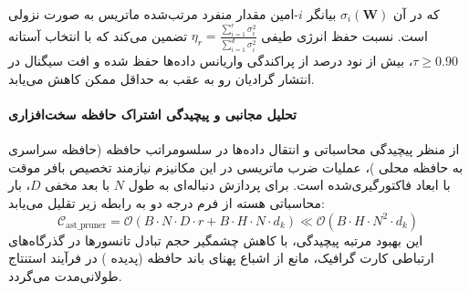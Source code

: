 که در آن $\sigma_i(\mathbf{W})$ بیانگر $i$-امین مقدار منفرد مرتب‌شده ماتریس به صورت نزولی است. نسبت حفظ انرژی طیفی $\eta_r = \frac{\sum_{i=1}^r \sigma_i^2}{\sum_{i=1}^{d} \sigma_i^2}$ تضمین می‌کند که با انتخاب آستانه $\tau \ge 0.90$، بیش از نود درصد از پراکندگی واریانس داده‌ها حفظ شده و افت سیگنال در انتشار گرادیان رو به عقب به حداقل ممکن کاهش می‌یابد.

\paragraph{تحلیل مجانبی و پیچیدگی اشتراک حافظه سخت‌افزاری}
از منظر پیچیدگی محاسباتی و انتقال داده‌ها در سلسومراتب حافظه (حافظه سراسری  به حافظه محلی )، عملیات ضرب ماتریسی در این مکانیزم نیازمند تخصیص بافر موقت با ابعاد فاکتورگیری‌شده است. برای پردازش دنباله‌ای به طول $N$ با بعد مخفی $D$، بار محاسباتی هسته از فرم درجه دو به رابطه زیر تقلیل می‌یابد:
\begin{equation}
\label{eq:complexity_ast_pruner}
\mathcal{C}_{\text{ast\_pruner}} = \mathcal{O}\left( B \cdot N \cdot D \cdot r + B \cdot H \cdot N \cdot d_k \right) \ll \mathcal{O}\left( B \cdot H \cdot N^2 \cdot d_k \right)
\end{equation}
این بهبود مرتبه پیچیدگی، با کاهش چشمگیر حجم تبادل تانسورها در گذرگاه‌های ارتباطی کارت گرافیک، مانع از اشباع پهنای باند حافظه (پدیده ) در فرآیند استنتاج طولانی‌مدت می‌گردد.
